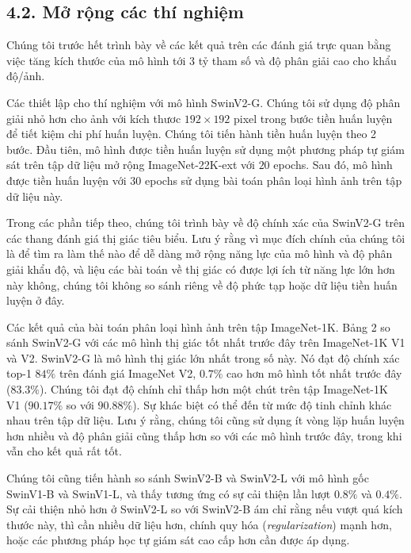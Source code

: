 \documentclass[times, twocolumn]{zHenriquesLab-StyleBioRxiv}
\begin{document}

\subsection*{4.2. Mở rộng các thí nghiệm}

Chúng tôi trước hết trình bày về các kết quả trên các đánh giá trực quan bằng việc tăng kích thước của mô hình tới $3$ tỷ tham số và độ phân giải cao cho khẩu độ/ảnh.

Các thiết lập cho thí nghiệm với mô hình SwinV2-G.  Chúng tôi sử dụng độ phân giải nhỏ hơn cho ảnh với kích thươc $192\times192$ pixel trong bước tiền huấn luyện để tiết kiệm chi phí huấn luyện. Chúng tôi tiến hành tiền huấn luyện theo 2 bước. Đầu tiên, mô hình được tiền huấn luyện sử dụng một phương pháp tự giám sát trên tập dữ liệu mở rộng ImageNet-22K-ext với $20$ epochs. Sau đó, mô hình được tiền huấn luyện với $30$ epochs sử dụng bài toán phân loại hình ảnh trên tập dữ liệu này.

Trong các phần tiếp theo, chúng tôi trình bày về độ chính xác của SwinV2-G trên các thang đánh giá thị giác tiêu biểu. Lưu ý rằng vì mục đích chính của chúng tôi là để tìm ra làm thế nào để dễ dàng mở rộng năng lực của mô hình và độ phân giải khẩu độ, và liệu các bài toán về thị giác có được lợi ích từ năng lực lớn hơn này không, chúng tôi không so sánh riêng về độ phức tạp hoặc dữ liệu tiền huấn luyện ở đây.

Các kết quả của bài toán phân loại hình ảnh trên tập ImageNet-1K. Bảng 2 so sánh SwinV2-G với các mô hình thị giác tốt nhất trước đây trên ImageNet-1K V1 và V2. SwinV2-G là mô hình thị giác lớn nhất trong số này. Nó đạt độ chính xác top-1 $84\%$ trên đánh giá ImageNet V2, $0.7\%$ cao hơn mô hình tốt nhất trước đây ($83.3\%$). Chúng tôi đạt độ chính chỉ thấp hơn một chút trên tập ImageNet-1K V1 ($90.17\%$ so với $90.88\%$). Sự khác biệt có thể đến từ mức độ tinh chỉnh khác nhau trên tập dữ liệu. Lưu ý rằng, chúng tôi cũng sử dụng ít vòng lặp huấn luyện hơn nhiều và độ phân giải cũng thấp hơn so với các mô hình trước đây, trong khi vẫn cho kết quả rất tốt.

Chúng tôi cũng tiến hành so sánh SwinV2-B và SwinV2-L với mô hình gốc SwinV1-B và SwinV1-L, và thấy tương ứng có sự cải thiện lần lượt $0.8\%$ và $0.4\%$. Sự cải thiện nhỏ hơn ở SwinV2-L so với SwinV2-B ám chỉ rằng nếu vượt quá kích thước này, thì cần nhiều dữ liệu hơn, chính quy hóa (\textit{regularization}) mạnh hơn, hoặc các phương pháp học tự giám sát cao cấp hơn cần được áp dụng.
\end{document}
